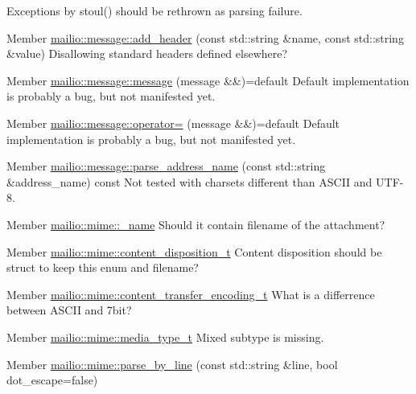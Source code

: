 \begin{DoxyRefList}
Exceptions by {\ttfamily stoul()} should be rethrown as parsing failure. 
\item[Member \mbox{\hyperlink{classmailio_1_1message_ae97adbcf190a4d42533377bce57d3837}{mailio::message::add\+\_\+header}} (const std\+::string \&name, const std\+::string \&value)]\label{todo__todo000031}%
%
Disallowing standard headers defined elsewhere? 
\item[Member \mbox{\hyperlink{classmailio_1_1message_ac582e86e1ff840e835123473e8b13004}{mailio::message::message}} (message \&\&)=default]\label{todo__todo000029}%
%
Default implementation is probably a bug, but not manifested yet. 
\item[Member \mbox{\hyperlink{classmailio_1_1message_a3a893534cf3b954d00bab8b90746c220}{mailio::message::operator=}} (message \&\&)=default]\label{todo__todo000030}%
%
Default implementation is probably a bug, but not manifested yet. 
\item[Member \mbox{\hyperlink{classmailio_1_1message_a784fe4171910d79a1480ea1f895d2090}{mailio::message::parse\+\_\+address\+\_\+name}} (const std\+::string \&address\+\_\+name) const]\label{todo__todo000032}%
%
Not tested with charsets different than A\+S\+C\+II and U\+T\+F-\/8. 
\item[Member \mbox{\hyperlink{classmailio_1_1mime_afba6beba3786d20171346468a9f1dd5d}{mailio::mime::\+\_\+name}} ]\label{todo__todo000038}%
%
Should it contain filename of the attachment? 
\item[Member \mbox{\hyperlink{classmailio_1_1mime_a71d7c80e9037643c8bc0af6306ed2895}{mailio::mime::content\+\_\+disposition\+\_\+t}} ]\label{todo__todo000035}%
%
Content disposition should be struct to keep this enum and filename? 
\item[Member \mbox{\hyperlink{classmailio_1_1mime_a6a5a0e83b90709a804c067c2d224a2d2}{mailio::mime::content\+\_\+transfer\+\_\+encoding\+\_\+t}} ]\label{todo__todo000034}%
%
What is a differrence between A\+S\+C\+II and 7bit? 
\item[Member \mbox{\hyperlink{classmailio_1_1mime_a95141c826202270eebc331485b4c1512}{mailio::mime::media\+\_\+type\+\_\+t}} ]\label{todo__todo000033}%
%
Mixed subtype is missing. 
\item[Member \mbox{\hyperlink{classmailio_1_1mime_a60ff1c34cbd5fa56c75119e71643e184}{mailio::mime::parse\+\_\+by\+\_\+line}} (const std\+::string \&line, bool dot\+\_\+escape=false)]\label{todo__todo000036}%

\end{DoxyRefList}
